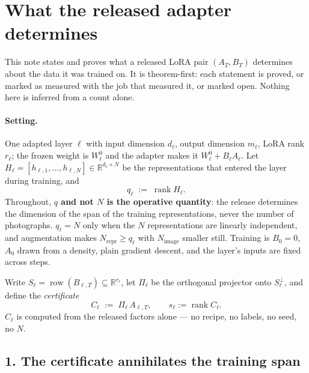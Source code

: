 \section*{What the released adapter determines}

This note states and proves what a released LoRA pair $(A_T,B_T)$ determines about the data it was
trained on. It is theorem-first: each statement is proved, or marked as measured with the job that
measured it, or marked open. Nothing here is inferred from a count alone.

\paragraph{Setting.} One adapted layer $\ell$ with input dimension $d_\ell$, output dimension
$m_\ell$, LoRA rank $r_\ell$; the frozen weight is $W_\ell^0$ and the adapter makes it
$W_\ell^0+B_\ell A_\ell$. Let $H_\ell=[h_{\ell,1},\dots,h_{\ell,N}]\in\mathbb R^{d_\ell\times N}$ be
the representations that entered the layer during training, and
\[
  q_\ell \;:=\; \operatorname{rank}H_\ell .
\]
Throughout, \textbf{$q$ and not $N$ is the operative quantity}: the release determines the dimension
of the span of the training representations, never the number of photographs. $q_\ell=N$ only when
the $N$ representations are linearly independent, and augmentation makes $N_{\text{repr}}\ge q_\ell$
with $N_{\text{image}}$ smaller still. Training is $B_0=0$, $A_0$ drawn from a density, plain
gradient descent, and the layer's inputs are fixed across steps.

\medskip
Write $S_\ell=\operatorname{row}(B_{\ell,T})\subseteq\mathbb R^{r_\ell}$, let $\Pi_\ell$ be the
orthogonal projector onto $S_\ell^{\perp}$, and define the \emph{certificate}
\[
  C_\ell \;:=\; \Pi_\ell\,A_{\ell,T}, \qquad s_\ell:=\operatorname{rank}C_\ell .
\]
$C_\ell$ is computed from the released factors alone --- no recipe, no labels, no seed, no $N$.

\subsection*{1. The certificate annihilates the training span}

